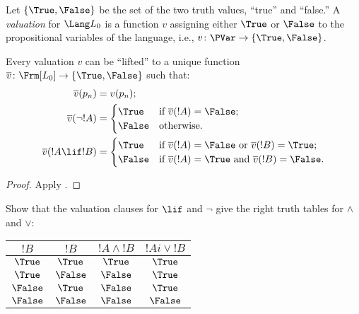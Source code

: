 \documentclass[../../../include/open-logic-section]{subfiles}
\begin{document}


\begin{defn}[Valuations] 
Let $\{\True, \False\}$ be the set of the two truth
values, ``true'' and ``false.'' A \emph{valuation} for $\Lang L_0$ is a
function $v$ assigning either $\True$ or $\False$ to the propositional
variables of the language, i.e., $v \colon \PVar \to \{\True, \False \}$.
\end{defn}

\begin{thm} Every valuation $v$ can be ``lifted'' to a unique function
$\overline{v} \colon \Frm[L_0] \to \{\True, \False \}$ such that: 
\begin{align*}
\overline{v}(p_n) & = v(p_n); \\ 
\overline{v}(\lnot !A) & = \begin{cases}
   \True & \text{if } \overline{v}(!A) = \False;\\ 
   \False & \text{otherwise.} 
\end{cases} \\ 
\overline{v}(!A \lif !B) & = \begin{cases} 
  \True & \text{if $\overline{v}(!A) = \False$ or $\overline{v}(!B) = \True$;}\\
  \False & \text{if $\overline{v}(!A) = \True$ and 
    $\overline{v}(!B) = \False$}. 
\end{cases}
\end{align*}
\end{thm}

\begin{proof} 
Apply . 
\end{proof}

\begin{prob} 
Show that the valuation clauses for $\lif$ and $\lnot$ give
the right truth tables for $\land$ and $\lor$: 
\begin{center}
\begin{tabular}{|cc||c|c|} \hline 
$!B$ & $!B$ & $!A \land !B$ & $!Ai \lor !B$ \\ 
\hline \hline 
$\True$ & $\True$ & $\True$ & $\True$ \\ 
$\True$ & $\False$ & $\False$ & $\True$ \\ 
$\False$ & $\True$ & $\False$ & $\True$ \\
$\False$ & $\False$ & $\False$ & $\False$ \\ 
\hline 
\end{tabular}
\end{center} 
\end{prob}
\end{document}
